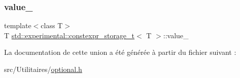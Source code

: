 \mbox{\label{unionstd_1_1experimental_1_1constexpr__storage__t_ab0f056b5b1e7bfde0dc04629fd0b9ade}} 
\subsubsection{\texorpdfstring{value\+\_\+}{value\_}}
{\footnotesize\ttfamily template$<$class T$>$ \\
T \hyperlink{unionstd_1_1experimental_1_1constexpr__storage__t}{std\+::experimental\+::constexpr\+\_\+storage\+\_\+t}$<$ T $>$\+::value\+\_\+}



La documentation de cette union a été générée à partir du fichier suivant \+:\begin{DoxyCompactItemize}
\item 
src/\+Utilitaires/\hyperlink{optional_8h}{optional.\+h}\end{DoxyCompactItemize}
